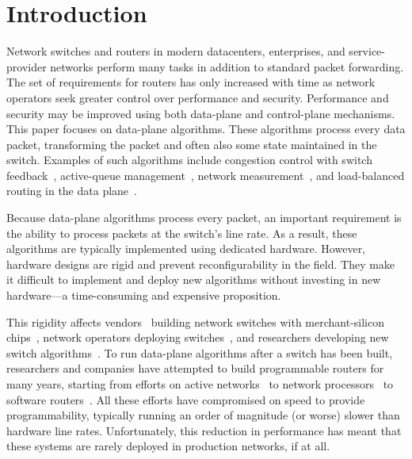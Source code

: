 \section{Introduction}
\label{s:intro}

Network switches and routers in modern datacenters, enterprises, and
service-provider networks perform many tasks in addition to standard packet
forwarding. The set of requirements for routers has only increased with time as
network operators seek greater control over performance and security.
Performance and security may be improved using both data-plane and
control-plane mechanisms. This paper focuses on data-plane algorithms. These
algorithms process every data packet, transforming the packet and often also
some state maintained in the switch.  Examples of such algorithms include
congestion control with switch feedback~\cite{xcp, rcp, pdq, dctcp},
active-queue management~\cite{red,blue,avq,codel,pie}, network
measurement~\cite{opensketch, bitmap_george, elephant_george}, and
load-balanced routing in the data plane~\cite{conga}.

Because data-plane algorithms process every packet, an important requirement is
the ability to process packets at the switch's line rate.  As a result, these
algorithms are typically implemented using dedicated hardware. However,
hardware designs are rigid and prevent reconfigurability in the field. They
make it difficult to implement and deploy new algorithms without investing in
new hardware---a time-consuming and expensive proposition.

This rigidity affects vendors~\cite{cisco_nexus, dell_force10, arista_7050}
building network switches with merchant-silicon chips~\cite{trident, tomahawk,
mellanox}, network operators deploying switches~\cite{google,facebook,vl2}, and
researchers developing new switch algorithms~\cite{xcp, codel, d3, detail,
pdq}.  To run data-plane algorithms after a switch has been built, researchers
and companies have attempted to build programmable routers for many years,
starting from efforts on active networks~\cite{active-nets} to network
processors~\cite{npu_survey} to software routers~\cite{click,routebricks,
fastpass, flexplane}. All these efforts have compromised on speed to provide
programmability, typically running an order of magnitude (or worse) slower than
hardware line rates. Unfortunately, this reduction in performance has meant
that these systems are rarely deployed in production networks, if at all.


